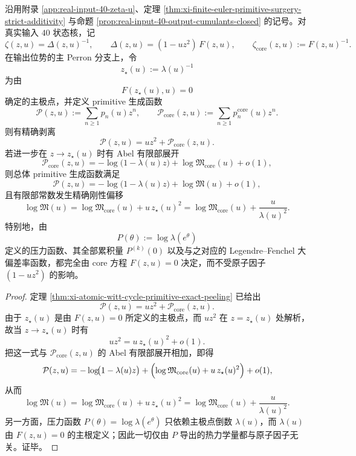 \begin{theorem}\label{thm:xi-real-input40-atomic-factor-thermodynamic-invariance}
沿用附录 \ref{app:real-input-40-zeta-u}、定理
\ref{thm:xi-finite-euler-primitive-surgery-strict-additivity} 与命题
\ref{prop:real-input-40-output-cumulants-closed} 的记号。对真实输入 \(40\) 状态核，记
\[
\zeta(z,u)=\Delta(z,u)^{-1},
\qquad
\Delta(z,u)=(1-uz^2)\,F(z,u),
\qquad
\zeta_{\mathrm{core}}(z,u):=F(z,u)^{-1}.
\]
在输出位势的主 Perron 分支上，令
\[
z_\star(u):=\lambda(u)^{-1}
\]
为由
\[
F(z_\star(u),u)=0
\]
确定的主极点，并定义 primitive 生成函数
\[
\mathcal P(z,u):=\sum_{n\ge 1}p_n(u)z^n,
\qquad
\mathcal P_{\mathrm{core}}(z,u):=\sum_{n\ge 1}p_n^{\mathrm{core}}(u)z^n.
\]
则有精确剥离
\[
\boxed{\;
\mathcal P(z,u)=uz^2+\mathcal P_{\mathrm{core}}(z,u).\;}
\]
若进一步在 \(z\to z_\star(u)\) 时有 Abel 有限部展开
\[
\mathcal P_{\mathrm{core}}(z,u)
=
-\log\!\bigl(1-\lambda(u)z\bigr)
+\log\mathfrak M_{\mathrm{core}}(u)+o(1),
\]
则总体 primitive 生成函数满足
\[
\mathcal P(z,u)
=
-\log\!\bigl(1-\lambda(u)z\bigr)
+\log\mathfrak M(u)+o(1),
\]
且有限部常数发生精确刚性偏移
\[
\boxed{\;
\log\mathfrak M(u)
=
\log\mathfrak M_{\mathrm{core}}(u)+u\,z_\star(u)^2
=
\log\mathfrak M_{\mathrm{core}}(u)+\frac{u}{\lambda(u)^2}.\;}
\]
特别地，由
\[
P(\theta):=\log\lambda(e^\theta)
\]
定义的压力函数、其全部累积量 \(P^{(k)}(0)\) 以及与之对应的
Legendre--Fenchel 大偏差率函数，都完全由 core 方程 \(F(z,u)=0\) 决定，而不受原子因子 \((1-uz^2)\) 的影响。
\end{theorem}
\begin{proof}
定理 \ref{thm:xi-atomic-witt-cycle-primitive-exact-peeling} 已给出
\[
\mathcal P(z,u)=uz^2+\mathcal P_{\mathrm{core}}(z,u).
\]
由于 \(z_\star(u)\) 是由 \(F(z,u)=0\) 所定义的主极点，而 \(uz^2\) 在 \(z=z_\star(u)\) 处解析，故当
\(z\to z_\star(u)\) 时有
\[
uz^2=u\,z_\star(u)^2+o(1).
\]
把这一式与 \(\mathcal P_{\mathrm{core}}(z,u)\) 的 Abel 有限部展开相加，即得
\[
\mathcal P(z,u)
=
-\log\!\bigl(1-\lambda(u)z\bigr)
+\Bigl(\log\mathfrak M_{\mathrm{core}}(u)+u\,z_\star(u)^2\Bigr)+o(1),
\]
从而
\[
\log\mathfrak M(u)=\log\mathfrak M_{\mathrm{core}}(u)+u\,z_\star(u)^2
=
\log\mathfrak M_{\mathrm{core}}(u)+\frac{u}{\lambda(u)^2}.
\]
另一方面，压力函数 \(P(\theta)=\log\lambda(e^\theta)\) 只依赖主极点倒数 \(\lambda(u)\)，而 \(\lambda(u)\) 由 \(F(z,u)=0\) 的主根定义；因此一切仅由 \(P\) 导出的热力学量都与原子因子无关。证毕。
\end{proof}


